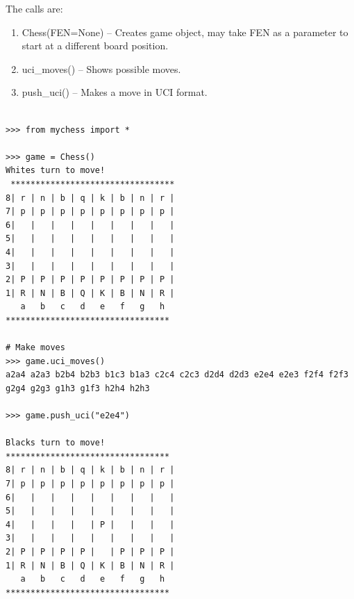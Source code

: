 \documentclass[10pt]{article}
\begin{document}
The calls are:

\begin{enumerate}[label=\arabic*)]
\item Chess(FEN=None) -- Creates game object, may take FEN as a parameter to start at a
    different board position.
\item uci\_moves() -- Shows possible moves.
\item push\_uci() -- Makes a move in UCI format.
\end{enumerate}



\begin{lstlisting}

>>> from mychess import *

>>> game = Chess()
Whites turn to move!
 *********************************
8| r | n | b | q | k | b | n | r |
7| p | p | p | p | p | p | p | p |
6|   |   |   |   |   |   |   |   |
5|   |   |   |   |   |   |   |   |
4|   |   |   |   |   |   |   |   |
3|   |   |   |   |   |   |   |   |
2| P | P | P | P | P | P | P | P |
1| R | N | B | Q | K | B | N | R |
   a   b   c   d   e   f   g   h
*********************************

# Make moves
>>> game.uci_moves()
a2a4 a2a3 b2b4 b2b3 b1c3 b1a3 c2c4 c2c3 d2d4 d2d3 e2e4 e2e3 f2f4 f2f3 g2g4 g2g3 g1h3 g1f3 h2h4 h2h3

>>> game.push_uci("e2e4")

Blacks turn to move!
*********************************
8| r | n | b | q | k | b | n | r |
7| p | p | p | p | p | p | p | p |
6|   |   |   |   |   |   |   |   |
5|   |   |   |   |   |   |   |   |
4|   |   |   |   | P |   |   |   |
3|   |   |   |   |   |   |   |   |
2| P | P | P | P |   | P | P | P |
1| R | N | B | Q | K | B | N | R |
   a   b   c   d   e   f   g   h
*********************************


\end{lstlisting}
\end{document}

